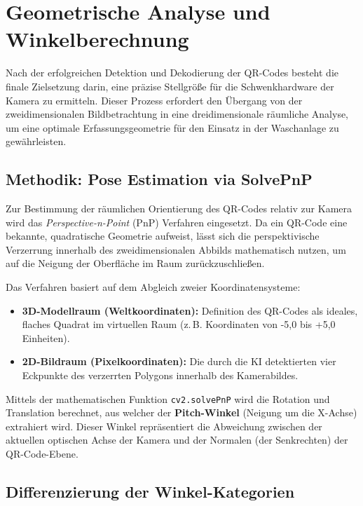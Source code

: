 \documentclass[
    a4paper,        %
    11pt,           %
    ngerman,        %
    parskip=half,   %
    listof=totoc,   %
    bibliography=totoc %
]{scrartcl}
\let\oldsection\section
\renewcommand\section{\clearpage\oldsection}
\begin{document}
\section{Geometrische Analyse und Winkelberechnung}

Nach der erfolgreichen Detektion und Dekodierung der QR-Codes besteht die finale Zielsetzung darin, eine präzise Stellgröße für die Schwenkhardware der Kamera zu ermitteln. Dieser Prozess erfordert den Übergang von der zweidimensionalen Bildbetrachtung in eine dreidimensionale räumliche Analyse, um eine optimale Erfassungsgeometrie für den Einsatz in der Waschanlage zu gewährleisten.

\subsection{Methodik: Pose Estimation via SolvePnP}

Zur Bestimmung der räumlichen Orientierung des QR-Codes relativ zur Kamera wird das \textit{Perspective-n-Point} (PnP) Verfahren eingesetzt. Da ein QR-Code eine bekannte, quadratische Geometrie aufweist, lässt sich die perspektivische Verzerrung innerhalb des zweidimensionalen Abbilds mathematisch nutzen, um auf die Neigung der Oberfläche im Raum zurückzuschließen.

Das Verfahren basiert auf dem Abgleich zweier Koordinatensysteme:
\begin{itemize}
    \item \textbf{3D-Modellraum (Weltkoordinaten):} Definition des QR-Codes als ideales, flaches Quadrat im virtuellen Raum (z.\,B. Koordinaten von -5,0 bis +5,0 Einheiten).
    \item \textbf{2D-Bildraum (Pixelkoordinaten):} Die durch die KI detektierten vier Eckpunkte des verzerrten Polygons innerhalb des Kamerabildes.
\end{itemize}

Mittels der mathematischen Funktion \texttt{cv2.solvePnP} wird die Rotation und Translation berechnet, aus welcher der \textbf{Pitch-Winkel} (Neigung um die X-Achse) extrahiert wird. Dieser Winkel repräsentiert die Abweichung zwischen der aktuellen optischen Achse der Kamera und der Normalen (der Senkrechten) der QR-Code-Ebene.

\subsection{Differenzierung der Winkel-Kategorien}
\end{document}
